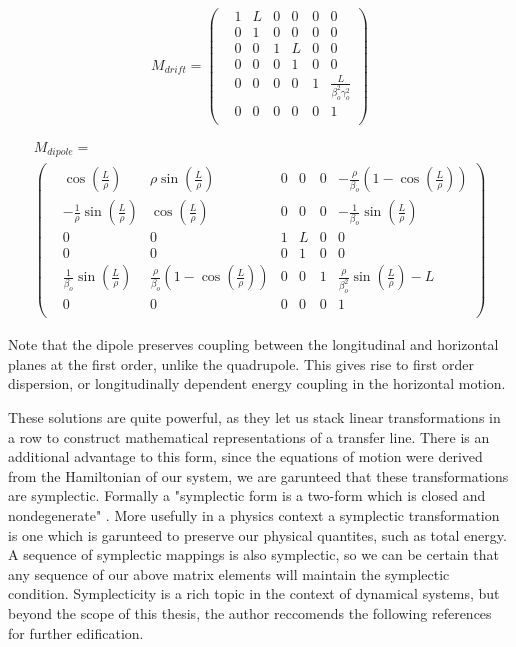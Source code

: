 \begin{equation} \label{mat:drift}
	M_{drift} =
\begin{pmatrix}
	&1 &L &0 &0 &0 &0\\
	&0 &1 &0 &0 &0 &0\\
	&0 &0 &1 &L &0 &0\\
	&0 &0 &0 &1 &0 &0\\
	&0 &0 &0 &0 &1 &\frac{L}{\beta_o^2\gamma_o^2}\\
	&0 &0 &0 &0 &0 &1\\
\end{pmatrix}
\end{equation}

\begin{multline} \label{mat:dipole}
	M_{dipole} = \\
\begin{pmatrix}
	&\cos{\left(\frac{L}{\rho}\right)} &\rho \sin{\left(\frac{L}{\rho}\right)} &0 &0 &0 &-\frac{\rho}{\beta_o}\left(1 - \cos{\left(\frac{L}{\rho}\right)}\right)\\
	&-\frac{1}{\rho}\sin{\left(\frac{L}{\rho}\right)} &\cos{\left(\frac{L}{\rho}\right)} &0 &0 &0 &-\frac{1}{\beta_o}\sin{\left(\frac{L}{\rho}\right)}\\
	&0 &0 &1 &L &0 &0\\
	&0 &0 &0 &1 &0 &0\\
	&\frac{1}{\beta_o}\sin{\left(\frac{L}{\rho}\right)} &\frac{\rho}{\beta_o}\left(1 - \cos{\left(\frac{L}{\rho}\right)}\right) &0 &0 &1 &\frac{\rho}{\beta_o^2}\sin{\left(\frac{L}{\rho}\right)} - L\\
	&0 &0 &0 &0 &0 &1\\
\end{pmatrix}
\end{multline}

Note that the dipole preserves coupling between the longitudinal and horizontal planes at the first order, unlike the quadrupole. This gives rise to first order dispersion, or longitudinally dependent energy coupling in the horizontal motion. 

These solutions are quite powerful, as they let us stack linear transformations in a row to construct mathematical representations of a transfer line. There is an additional advantage to this form, since the equations of motion were derived from the Hamiltonian of our system, we are garunteed that these transformations are symplectic. Formally a "symplectic form is a two-form which is closed and nondegenerate" \cite{JoseAndSalatan}. More usefully in a physics context a symplectic transformation is one which is garunteed to preserve our physical quantites, such as total energy. A sequence of symplectic mappings is also symplectic, so we can be certain that any sequence of our above matrix elements will maintain the symplectic condition. Symplecticity is a rich topic in the context of dynamical systems, but beyond the scope of this thesis, the author reccomends the following references for further edification.

